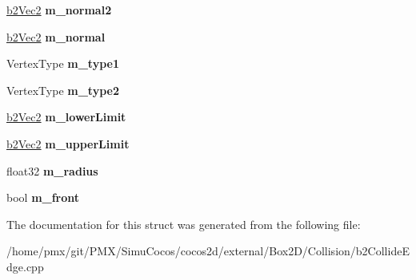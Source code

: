 \begin{DoxyCompactItemize}
\hyperlink{structb2Vec2}{b2\+Vec2} {\bfseries m\+\_\+normal2}
\item 
\mbox{\label{structb2EPCollider_a67ff23f9fada3a733928380da8653348}} 
\hyperlink{structb2Vec2}{b2\+Vec2} {\bfseries m\+\_\+normal}
\item 
\mbox{\label{structb2EPCollider_ad2541e4c9358d5ffcaca19b25836392b}} 
Vertex\+Type {\bfseries m\+\_\+type1}
\item 
\mbox{\label{structb2EPCollider_a71889f34bef412e3cbfbbab605210b7e}} 
Vertex\+Type {\bfseries m\+\_\+type2}
\item 
\mbox{\label{structb2EPCollider_a6b48818ac312de825aaf55b46aceea1e}} 
\hyperlink{structb2Vec2}{b2\+Vec2} {\bfseries m\+\_\+lower\+Limit}
\item 
\mbox{\label{structb2EPCollider_a5da77944d10d87ca7222e3d8d00ac205}} 
\hyperlink{structb2Vec2}{b2\+Vec2} {\bfseries m\+\_\+upper\+Limit}
\item 
\mbox{\label{structb2EPCollider_a1efd359a8c17680bbdef093dd07fbb9d}} 
float32 {\bfseries m\+\_\+radius}
\item 
\mbox{\label{structb2EPCollider_aa9443e27e043bf80916992ca96bdedd2}} 
bool {\bfseries m\+\_\+front}
\end{DoxyCompactItemize}


The documentation for this struct was generated from the following file\+:\begin{DoxyCompactItemize}
\item 
/home/pmx/git/\+P\+M\+X/\+Simu\+Cocos/cocos2d/external/\+Box2\+D/\+Collision/b2\+Collide\+Edge.\+cpp\end{DoxyCompactItemize}
